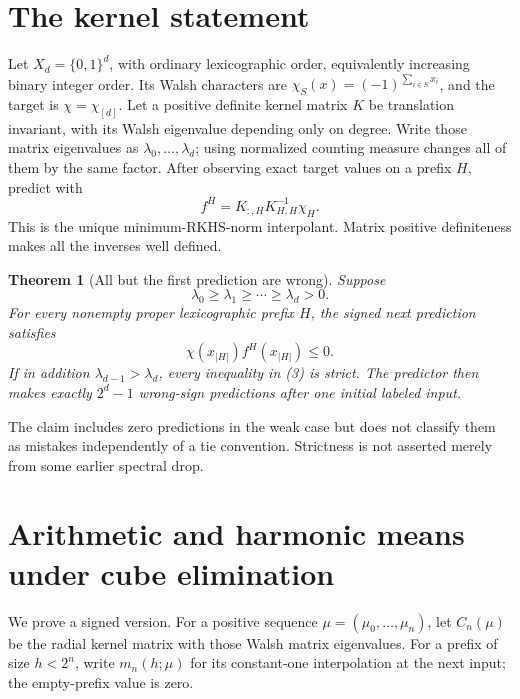 \documentclass[11pt]{article}
\newtheorem{theorem}{Theorem}\newtheorem{lemma}[theorem]{Lemma}
\begin{document}
\section{The kernel statement}
Let $X_d=\{0,1\}^d$, with ordinary lexicographic order, equivalently
increasing binary integer order. Its Walsh characters are
$\chi_S(x)=(-1)^{\sum_{i\in S}x_i}$, and the target is
$\chi=\chi_{[d]}$. Let a positive definite kernel matrix $K$ be
translation invariant, with its Walsh eigenvalue depending only on
degree. Write those matrix eigenvalues as $\lambda_0,\ldots,\lambda_d$;
using normalized counting measure changes all of them by the same factor.
After observing exact target values on a prefix $H$, predict with
\[
                 f^H=K_{:,H}K_{H,H}^{-1}\chi_H.               \tag{1}
\]
This is the unique minimum-RKHS-norm interpolant. Matrix positive
definiteness makes all the inverses well defined.

\begin{theorem}[All but the first prediction are wrong]
\label{thm:main}
Suppose
\[
          \lambda_0\ge\lambda_1\ge\cdots\ge\lambda_d>0.
                                                               \tag{2}
\]
For every nonempty proper lexicographic prefix $H$, the signed next
prediction satisfies
\[
                       \chi(x_{|H|})f^H(x_{|H|})\le0.         \tag{3}
\]
If in addition $\lambda_{d-1}>\lambda_d$, every inequality in (3)
is strict. The predictor then makes exactly $2^d-1$ wrong-sign
predictions after one initial labeled input.
\end{theorem}
The claim includes zero predictions in the weak case but does not
classify them as mistakes independently of a tie convention.
Strictness is not asserted merely from some earlier spectral drop.

\section{Arithmetic and harmonic means under cube elimination}
We prove a signed version. For a positive sequence
$\mu=(\mu_0,\ldots,\mu_n)$, let $C_n(\mu)$ be the radial kernel
matrix with those Walsh matrix eigenvalues. For a prefix of size $h<2^n$,
write $m_n(h;\mu)$ for its constant-one interpolation at the next input;
the empty-prefix value is zero.
\end{document}

